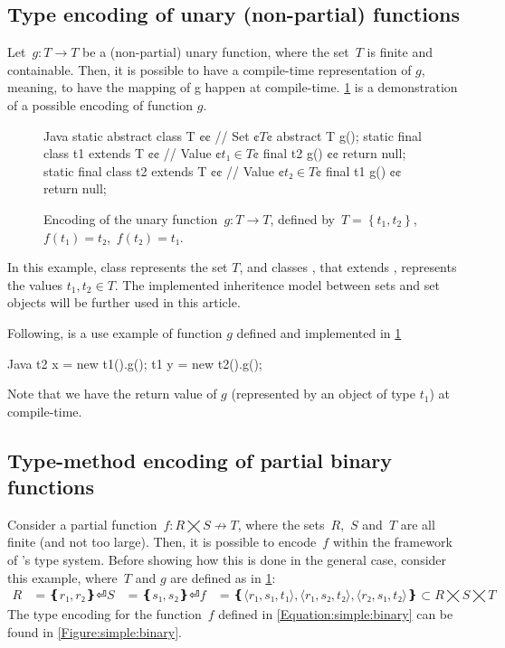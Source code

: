 \subsection{Type encoding of unary (non-partial) functions}
Let~$g: T \rightarrow T $ be a (non-partial) unary function,
  where the set~$T$ is finite and containable.
Then, it is possible to have a compile-time representation of $g$,
  meaning, to have the mapping of g happen at compile-time.  
\cref{Figure:unary:function} is a demonstration of a possible encoding
of function $g$.

\begin{figure}[hbt]
  \begin{Code}{Java}
static abstract class T {¢¢ // Set ¢$T$¢
  abstract T g();
  static final class t1 extends T {¢¢ // Value ¢$t₁∈T$¢
    final t2 g() {¢¢ return null; }
  }
  static final class t2 extends T {¢¢ // Value ¢$t₂∈T$¢
    final t1 g() {¢¢ return null; }
  }
}
\end{Code}
  \caption{Encoding of the unary function~$g: T→T$,
  defined by~$T=\left\{ t_1,t_2 \right\}$,~$f(t₁)=t₂$,~$f(t₂)=t₁$.}
  \label{Figure:unary:function}
\end{figure}
In this example, class  represents the set $T$, and classes 
  , that extends , represents the values $t_1,t_2 \in T $.
  The implemented inheritence model between sets and set objects will be further used in this article.

Following, is a use example of function $g$ defined and implemented in \cref{Figure:unary:function}

\begin{code}{Java}
  t2 x = new t1().g();
  t1 y = new t2().g();
\end{code}
  
Note that we have the return value of $g$ (represented by an object of type $t_1$) at compile-time.

\subsection{Type-method encoding of partial binary functions}
Consider a partial function~$f: R⨉S↛T$,
  where the sets~$R$,~$S$ and~$T$ are all finite (and not too large).
Then, it is possible to encode~$f$ within the framework of \Java's type system.
Before showing how this is done in the general case, consider this example, 
where~$T$ and $g$ are defined as in \cref{Figure:unary:function}:
\begin{equation}
  \label{Equation:simple:binary}
\begin{split}
  R & = ❴ r₁, r₂❵⏎
  S & = ❴ s₁, s₂❵⏎
  f & = ❴ ⟨r₁, s₁, t₁⟩, ⟨r₁, s₂, t₂⟩, ⟨r₂, s₁, t₂⟩ ❵ ⊂R⨉S⨉T
\end{split}
\end{equation}
The \Java type encoding for the function~$f$ defined in \cref{Equation:simple:binary}
  can be found in \cref{Figure:simple:binary}.

